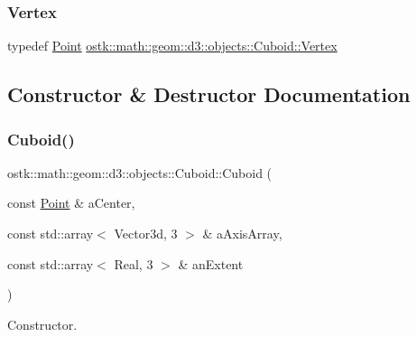 \mbox{\label{classostk_1_1math_1_1geom_1_1d3_1_1objects_1_1_cuboid_a0d3440e0c30348ece10f3658130e9b55}} 
\subsubsection{\texorpdfstring{Vertex}{Vertex}}
{\footnotesize\ttfamily typedef \hyperlink{classostk_1_1math_1_1geom_1_1d3_1_1objects_1_1_point}{Point} \hyperlink{classostk_1_1math_1_1geom_1_1d3_1_1objects_1_1_cuboid_a0d3440e0c30348ece10f3658130e9b55}{ostk\+::math\+::geom\+::d3\+::objects\+::\+Cuboid\+::\+Vertex}}



\subsection{Constructor \& Destructor Documentation}
\mbox{\label{classostk_1_1math_1_1geom_1_1d3_1_1objects_1_1_cuboid_a1da071d7cbb0a694348628f098f77c5b}} 
\subsubsection{\texorpdfstring{Cuboid()}{Cuboid()}}
{\footnotesize\ttfamily ostk\+::math\+::geom\+::d3\+::objects\+::\+Cuboid\+::\+Cuboid (\begin{DoxyParamCaption}\item[{const \hyperlink{classostk_1_1math_1_1geom_1_1d3_1_1objects_1_1_point}{Point} \&}]{a\+Center,  }\item[{const std\+::array$<$ Vector3d, 3 $>$ \&}]{a\+Axis\+Array,  }\item[{const std\+::array$<$ Real, 3 $>$ \&}]{an\+Extent }\end{DoxyParamCaption})}



Constructor. 


